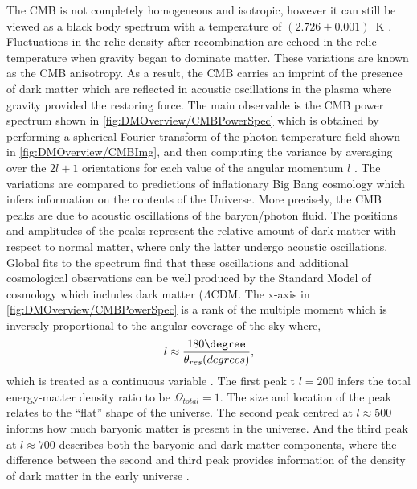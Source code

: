 The CMB is not completely homogeneous and isotropic, however it can still be viewed as a black body spectrum with a temperature of $(2.726\pm0.001)$~K \cite{Fixsen_2009}. Fluctuations in the relic density after recombination are echoed in the relic temperature when gravity began to dominate matter. These variations are known as the CMB anisotropy. As a result, the CMB carries an imprint of the presence of dark matter which are reflected in acoustic oscillations in the plasma where gravity provided the restoring force. The main observable is the CMB power spectrum shown in \autoref{fig:DMOverview/CMBPowerSpec} which is obtained by performing a spherical Fourier transform of the photon temperature field shown in \autoref{fig:DMOverview/CMBImg}, and then computing the variance by averaging over the $2l+1$ orientations for each value of the angular momentum $l$ \cite{Cirelli:2024ssz}. The variations are compared to predictions of inflationary Big Bang cosmology which infers information on the contents of the Universe. More precisely, the CMB peaks are due to acoustic oscillations of the baryon/photon fluid. The positions and amplitudes of the peaks represent the relative amount of dark matter with respect to normal matter, where only the latter undergo acoustic oscillations. Global fits to the spectrum find that these oscillations and additional cosmological observations can be well produced by the Standard Model of cosmology which includes dark matter ($\Lambda \text{CDM}$. The x-axis in \autoref{fig:DMOverview/CMBPowerSpec} is a rank of the multiple moment which is inversely proportional to the angular coverage of the sky where,
\begin{equation}
    l \approx\frac{180\degree}{\theta_{res}(degrees)},
\end{equation}
which is treated as a continuous variable \cite{Young2016}. The first peak t $l=200$ infers the total energy-matter density ratio to be $\Omega_{total}=1$. The size and location of the peak relates to the ``flat'' shape of the universe. The second peak centred at $l\approx500$ informs how much baryonic matter is present in the universe. And the third peak at $l\approx700$ describes both the baryonic and dark matter components, where the difference between the second and third peak provides information of the density of dark matter in the early universe \cite{Young2016}.
